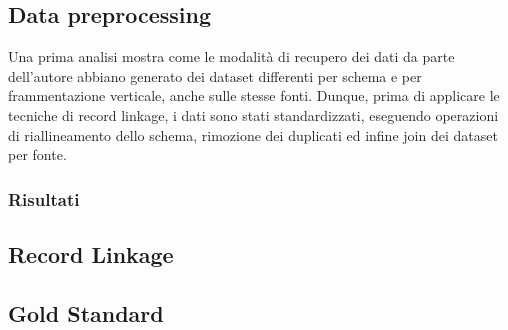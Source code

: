 \documentclass[a4paper,12pt]{article}
\begin{document}
\subsection{Data preprocessing}
Una prima analisi mostra come le modalità di recupero dei dati da parte dell'autore abbiano generato dei dataset differenti per schema e per frammentazione verticale, anche sulle stesse fonti. Dunque, prima di applicare le tecniche di record linkage, i dati sono stati standardizzati, eseguendo operazioni di riallineamento dello schema, rimozione dei duplicati ed infine join dei dataset per fonte.
\subsubsection{Risultati}

\subsection{Record Linkage}

\subsection{Gold Standard}
\end{document}
